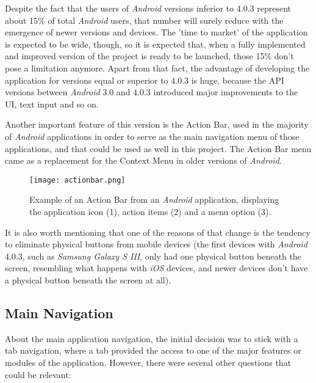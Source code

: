 Despite the fact that the users of \emph{Android} versions inferior to 4.0.3 represent about 15\% of total \emph{Android} users, that number will surely reduce with the emergence of newer versions and devices. The 'time to market' of the application is expected to be wide, though, so it is expected that, when a fully implemented and improved version of the project is ready to be launched, those 15\% don't pose a limitation anymore. Apart from that fact, the advantage of developing the application for versions equal or superior to 4.0.3 is huge, because the API versions between \emph{Android} 3.0 and 4.0.3 introduced major improvements to the UI, text input and so on. 

Another important feature of this version is the Action Bar, used in the majority of \emph{Android} applications in order to serve as the main navigation menu of those applications, and that could be used as well in this project. The Action Bar menu came as a replacement for the Context Menu in older versions of \emph{Android}.

\clearpage

\begin{figure}[h!]
  \begin{center}
    \leavevmode
    \texttt{[image: actionbar.png]}
    \caption{Example of an Action Bar from an \emph{Android} application, displaying the application icon (1), action items (2) and a menu option (3).}
    \label{fig:action}
  \end{center}
\end{figure}

It is also worth mentioning that one of the reasons of that change is the tendency to eliminate physical buttons from mobile devices (the first devices with \emph{Android} 4.0.3, such as \emph{Samsung Galaxy S III}, only had one physical button beneath the screen, resembling what happens with \emph{iOS} devices, and newer devices don't have a physical button beneath the screen at all).  

\subsection{Main Navigation}

About the main application navigation, the initial decision was to stick with a tab navigation, where a tab provided the access to one of the major features or modules of the application. However, there were several other questions that could be relevant:

